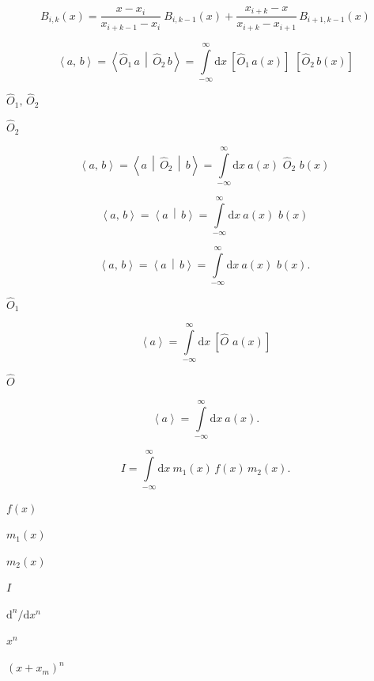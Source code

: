 \documentclass{article}
\begin{document}
\[B_{i,k}(x) = \frac{x - x_i}{x_{i + k -1} - x_i}\ B_{i, k-1}(x)
+ \frac{x_{i+k}-x}{x_{i+k}-x_{i+1}}\,B_{i+1,k-1}(x)\]
\pagebreak

\[\left\langle a,\, b\right\rangle =
\left\langle \hat{O}_1\,a\,\middle|\,\hat{O}_2\,b\right\rangle =
\int\limits_{-\infty}^{\infty} \mathrm{d}x~\left[\hat{O}_1\,a(x)\right]
\,\,\left[\hat{O}_2\,b(x)\right] \]
\pagebreak

$\hat{O}_1,\,\hat{O}_2$
\pagebreak

$\hat{O}_2$
\pagebreak

\[\left\langle a,\, b\right\rangle  =
\left\langle a\,\middle|\,\hat{O}_2\,\middle|\,b\right\rangle =
\int\limits_{-\infty}^{\infty} \mathrm{d}x~a(x) \,\,\hat{O}_2\,\,b(x)\ \]
\pagebreak

\[\left\langle a,\, b\right\rangle = \left\langle
a\,\middle|\,b\right\rangle = \int\limits_{-\infty}^{\infty} \mathrm{d}x~a(x)
\,\,b(x)\ \]
\pagebreak

\[\left\langle a,\, b\right\rangle =
\left\langle a\,\middle|\,b\right\rangle =  \int\limits_{-\infty}^{\infty}
\mathrm{d}x~a(x) \,\,b(x).\ \]
\pagebreak

$\hat{O}_1$
\pagebreak

\[\left\langle
a\right\rangle=\int\limits_{-\infty}^{\infty}\mathrm{d}x~\left[\hat{O}\,\,
a(x)\right]\]
\pagebreak

$\hat{O}$
\pagebreak

\[\left\langle
a\right\rangle=\int\limits_{-\infty}^{\infty}\mathrm{d}x~a(x).\]
\pagebreak

\[I=\int\limits_{-\infty}^{\infty} \mathrm{d}x~
m_1(x)\, f(x)\, m_2(x).\]
\pagebreak

$f(x)$
\pagebreak

$m_1(x)$
\pagebreak

$m_2(x)$
\pagebreak

$I$
\pagebreak

$\mathrm{d}^n/\mathrm{d}x^n$
\pagebreak

$x^n$
\pagebreak

$(x + x_m)^n$
\pagebreak
\end{document}

